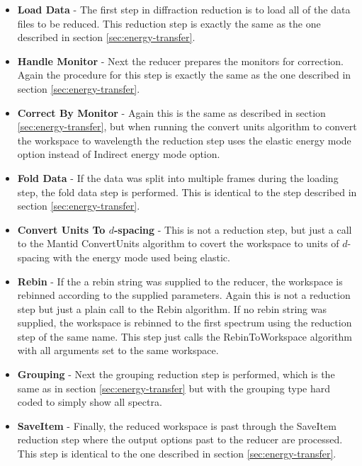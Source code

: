 \documentclass[paper=a4, fontsize=11pt]{scrartcl}	%
\numberwithin{equation}{section}															%
\numberwithin{figure}{section}																%
\numberwithin{table}{section}																%
\begin{document}
\begin{itemize}
\item \textbf{Load Data} - The first step in diffraction reduction is to load all of the data files to be reduced. This reduction step is exactly the same as the one described in section \ref{sec:energy-transfer}.

\item \textbf{Handle Monitor} - Next the reducer prepares the monitors for correction. Again the procedure for this step is exactly the same as the one described in section \ref{sec:energy-transfer}.

\item \textbf{Correct By Monitor} - Again this is the same as described in section \ref{sec:energy-transfer}, but when running the convert units algorithm to convert the workspace to wavelength the reduction step uses the elastic energy mode option instead of Indirect energy mode option.

\item \textbf{Fold Data} - If the data was split into multiple frames during the loading step, the fold data step is performed. This is identical to the step described in section \ref{sec:energy-transfer}.

\item \textbf{Convert Units To $d$-spacing} - This is not a reduction step, but just a call to the Mantid ConvertUnits algorithm to covert the workspace to units of $d$-spacing with the energy mode used being elastic.

\item \textbf{Rebin} - If the a rebin string was supplied to the reducer, the workspace is rebinned according to the supplied parameters. Again this is not a reduction step but just a plain call to the Rebin algorithm. If no rebin string was supplied, the workspace is rebinned to the first spectrum using the reduction step of the same name. This step just calls the RebinToWorkspace algorithm with all arguments set to the same workspace.

\item \textbf{Grouping} - Next the grouping reduction step is performed, which is the same as in section \ref{sec:energy-transfer} but with the grouping type hard coded to simply show all spectra.

\item \textbf{SaveItem} - Finally, the reduced workspace is past through the SaveItem reduction step where the output options past to the reducer are processed. This step is identical to the one described in section \ref{sec:energy-transfer}.

\end{itemize}
\end{document}

